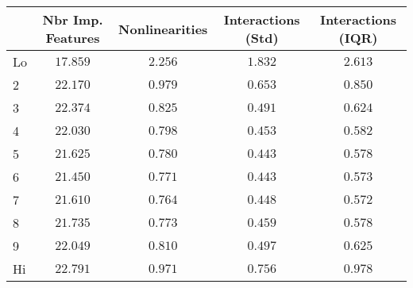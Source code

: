 \begin{tabular}{@{}lcccc@{}}%
\toprule%
&Nbr Imp. Features&Nonlinearities&Interactions (Std)&Interactions (IQR)\\%
\midrule%
Lo&$17.859$&$2.256$&$1.832$&$2.613$\\%
2&$22.170$&$0.979$&$0.653$&$0.850$\\%
3&$22.374$&$0.825$&$0.491$&$0.624$\\%
4&$22.030$&$0.798$&$0.453$&$0.582$\\%
5&$21.625$&$0.780$&$0.443$&$0.578$\\%
6&$21.450$&$0.771$&$0.443$&$0.573$\\%
7&$21.610$&$0.764$&$0.448$&$0.572$\\%
8&$21.735$&$0.773$&$0.459$&$0.578$\\%
9&$22.049$&$0.810$&$0.497$&$0.625$\\%
Hi&$22.791$&$0.971$&$0.756$&$0.978$\\\bottomrule%
%
\end{tabular}